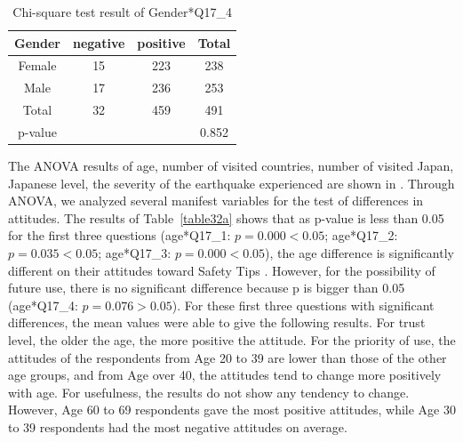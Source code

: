 \begin{table}[h]
  \vspace{-0.2cm}
  \caption{Chi-square test result of Gender*Q17\_4 }
  \label{table31d}
  \centering
\begin{tabular}{cccc}
\hline
Gender & negative & positive & Total \\
\hline
Female & 15                           & 223                          & 238                       \\
Male   & 17                         & 236                      & 253                       \\
Total  & 32                           & 459                          & 491                       \\
\hline
p-value      &        &      & 0.852   \\
\hline                   
\end{tabular}
\end{table}

\cleardoublepage

The ANOVA results of age, number of visited countries, number of visited Japan, Japanese level, the severity of the earthquake experienced are shown in . Through ANOVA, we analyzed several manifest variables for the test of differences in attitudes. The results of Table~\ref{table32a} shows that as p-value is less than 0.05 for the first three questions (age*Q17\_1: $p=0.000<0.05$; age*Q17\_2: $p=0.035<0.05$; age*Q17\_3: $p=0.000<0.05$), the age difference is significantly different on their attitudes toward Safety Tips . However, for the possibility of future use, there is no significant difference because p is bigger than 0.05 (age*Q17\_4: $p=0.076>0.05$). For these first three questions with significant differences, the mean values were able to give the following results. For trust level, the older the age, the more positive the attitude. For the priority of use, the attitudes of the respondents from Age 20 to 39 are lower than those of the other age groups, and from Age over 40, the attitudes tend to change more positively with age. For usefulness, the results do not show any tendency to change. However, Age 60 to 69 respondents gave the most positive attitudes, while Age 30 to 39 respondents had the most negative attitudes on average. 

